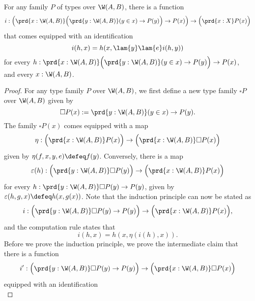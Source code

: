\begin{thm}
  For any family $P$ of types over $\W(A,B)$, there is a function
  \begin{equation*}
    i : \Big(\prd{x:\W(A,B)}\Big(\prd{y:\W(A,B)}(y\in x)\to P(y)\Big)\to P(x)\Big)\to \Big(\prd{x:X}P(x)\Big)
  \end{equation*}
  that comes equipped with an identification
  \begin{equation*}
    i(h,x)=h(x,\lam{y}\lam{e}i(h,y))
  \end{equation*}
  for every $h:\prd{x:\W(A,B)}\Big(\prd{y:\W(A,B)}(y\in x)\to P(y)\Big)\to P(x)$, and every $x:\W(A,B)$.
\end{thm}

\begin{proof}
  For any type family $P$ over $\W(A,B)$, we first define a new type family $\square P$ over $\W(A,B)$ given by
  \begin{equation*}
    \square P(x):=\prd{y:\W(A,B)}(y\in x)\to P(y).
  \end{equation*}
  The family $\square P(x)$ comes equipped with a map
  \begin{equation*}
    \eta : \Big(\prd{x:\W(A,B)}P(x)\Big)\to \Big(\prd{x:\W(A,B)}\square P(x)\Big)
  \end{equation*}
  given by $\eta(f,x,y,e)\defeq f(y)$. Conversely, there is a map
  \begin{equation*}
    \varepsilon(h) : \Big(\prd{y:\W(A,B)}\square P(y)\Big) \to \Big(\prd{x:\W(A,B)}P(x)\Big)
  \end{equation*}
  for every $h:\prd{y:\W(A,B)}\square P (y)\to P(y)$, given by $\varepsilon(h,g,x)\defeq h(x,g(x))$. Note that the induction principle can now be stated as
  \begin{equation*}
    i : \Big(\prd{y:\W(A,B)}\square P (y)\to P(y)\Big)\to\Big(\prd{x:\W(A,B)}P(x)\Big),
  \end{equation*}
  and the computation rule states that
  \begin{equation*}
    i(h,x)=h(x,\eta(i(h),x)).
  \end{equation*}
  Before we prove the induction principle, we prove the intermediate claim that there is a function
  \begin{equation*}
    i' : \Big(\prd{y:\W(A,B)}\square P (y)\to P(y)\Big) \to \Big(\prd{x:\W(A,B)}\square P(x)\Big)
  \end{equation*}
  equipped with an identification
  \begin{equation*}

\end{equation*}
\end{proof}
